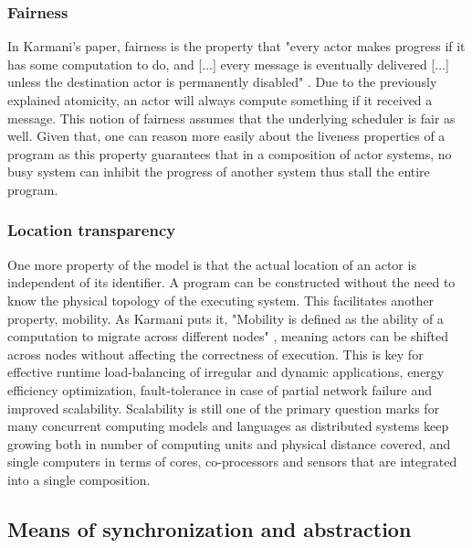 \documentclass[A4]{article}
\begin{document}
\subsubsection{Fairness}
In Karmani's paper, fairness is the property that "every actor makes progress if it has some computation to do, and [...] every message is eventually delivered [...] unless the destination actor is permanently disabled" \cite[p.~5]{reference/parallel/KarmaniA11}. Due to the previously explained atomicity, an actor will always compute something if it received a message. 
This notion of fairness assumes that the underlying scheduler is fair as well. 
Given that, one can reason more easily about the liveness properties of a program \cite[p.~5]{reference/parallel/KarmaniA11} as this property guarantees that in a composition of actor systems, no busy system can inhibit the progress of another system thus stall the entire program.
\subsubsection{Location transparency}
One more property of the model is that the actual location of an actor is independent of its identifier. A program can be constructed without the need to know the physical topology of the executing system. This facilitates another property, mobility.
As Karmani puts it, "Mobility is defined as the ability of a computation to migrate across different nodes" \cite[p.~5]{reference/parallel/KarmaniA11}, meaning actors can be shifted across nodes without affecting the correctness of execution. This is key for effective runtime load-balancing of irregular and dynamic applications, energy efficiency optimization, fault-tolerance in case of partial network failure and improved scalability. Scalability is still one of the primary question marks for many concurrent computing models and languages as distributed systems keep growing both in number of computing units and physical distance covered, and single computers in terms of cores, co-processors and sensors that are integrated into a single composition. 

\subsection{Means of synchronization and abstraction}
\end{document}
